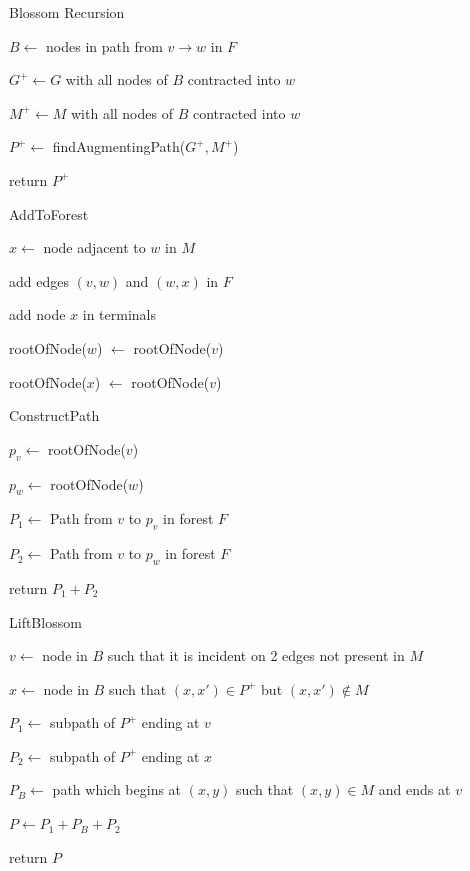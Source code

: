 \begin{algorithm}[!h]
\caption{Blossom Recursion}

$B \leftarrow$ nodes in path from $v \to w$ in $F$

$G^+ \leftarrow G$ with all nodes of $B$ contracted into $w$

$M^+ \leftarrow M$ with all nodes of $B$ contracted into $w$

$P^+ \leftarrow$ findAugmentingPath($G^+, M^+$)


return $P^+$
\end{algorithm}

\begin{algorithm}[!h]
\caption{AddToForest}

$x \leftarrow$ node adjacent to $w$ in $M$

add edges $(v, w)$ and $(w, x)$ in $F$

add node $x$ in terminals

rootOfNode($w$) $\leftarrow$ rootOfNode($v$)

rootOfNode($x$) $\leftarrow$ rootOfNode($v$)
\end{algorithm}

\begin{algorithm}[H]
\caption{ConstructPath}

$p_v \leftarrow$ rootOfNode($v$)

$p_w \leftarrow$ rootOfNode($w$)

$P_1 \leftarrow$ Path from $v$ to $p_v$ in forest $F$

$P_2 \leftarrow$ Path from $v$ to $p_w$ in forest $F$

return $P_1 + P_2$
\end{algorithm}

\begin{algorithm}[!h]
\caption{LiftBlossom}
$v \leftarrow$ node in $B$ such that it is incident on 2 edges not present in $M$

$x \leftarrow$ node in $B$ such that $(x, x') \in P^+$ but $(x, x') \notin M$


$P_1 \leftarrow$ subpath of $P^+$ ending at $v$

$P_2 \leftarrow$ subpath of $P^+$ ending at $x$

$P_B \leftarrow$ path which begins at $(x, y)$ such that $(x, y) \in M$ and ends at $v$

$P \leftarrow P_1 + P_B + P_2$

return $P$
\end{algorithm}

